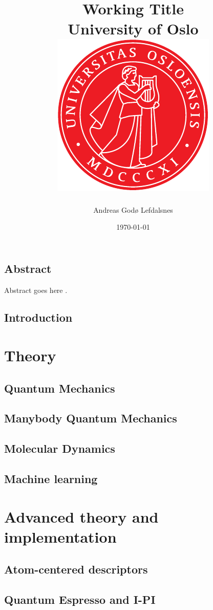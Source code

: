 \documentclass[12pt]{report}
\title{
{Working Title}\\
{\Large University of Oslo}\\
{\includegraphics{uio.pdf}}
}
\author{Andreas Godø Lefdalsnes}
\date{\today}
\begin{document}
\maketitle

\chapter*{Abstract}
Abstract goes here \parencite[e.g.][page 300]{einstein}.
 
\tableofcontents

\chapter{Introduction}


\part{Theory}
 
\chapter{Quantum Mechanics}


\chapter{Manybody Quantum Mechanics}

 
\chapter{Molecular Dynamics}

 
\chapter{Machine learning}


\part{Advanced theory and implementation}

\chapter{Atom-centered descriptors}


\chapter{Quantum Espresso and I-PI}
\end{document}
